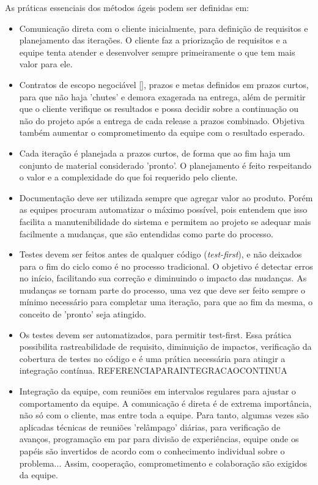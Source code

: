 \documentclass[10pt,a4paper,font=plain]{abnt}
\begin{document}
As práticas essenciais dos métodos ágeis podem ser definidas em:
\begin{itemize}

\item Comunicação direta com o cliente inicialmente, para definição de requisitos e planejamento das iterações. O cliente faz a priorização de requisitos e a equipe tenta atender e desenvolver sempre primeiramente o que tem mais valor para ele. 

\item Contratos de escopo negociável [], prazos e metas definidos em prazos curtos, para que não haja 'chutes' e demora exagerada na entrega, além de permitir que o cliente verifique os resultados e possa decidir sobre a continuação ou não do projeto após a entrega de cada release a prazos combinado. Objetiva também aumentar o comprometimento da equipe com o resultado esperado.

\item Cada iteração é planejada a prazos curtos, de forma que ao fim haja um conjunto de material considerado 'pronto'. O planejamento é feito respeitando o valor e a complexidade do que foi requerido pelo cliente.

\item Documentação deve ser utilizada sempre que agregar valor ao produto. Porém as equipes procuram automatizar o máximo possível, pois entendem que isso facilita a manutenibilidade do sistema e permitem ao projeto se adequar mais facilmente a mudanças, que são entendidas como parte do processo.

\item Testes devem ser feitos antes de qualquer código (\textit{test-first}), e não deixados para o fim do ciclo como é no processo tradicional. O objetivo é detectar erros no início, facilitando sua correção e diminuindo o impacto das mudanças. As mudanças se tornam parte do processo, uma vez que deve ser feito sempre o mínimo necessário para completar uma iteração, para que ao fim da mesma, o conceito de 'pronto' seja atingido.

\item Os testes devem ser automatizados, para permitir test-first. Essa prática possibilita rastreabilidade de requisito, diminuição de impactos, verificação da cobertura de testes no código e é uma prática necessária para atingir a integração contínua. REFERENCIAPARAINTEGRACAOCONTINUA

\item Integração da equipe, com reuniões em intervalos regulares para ajustar o comportamento da equipe. A comunicação é direta é de extrema importância, não só com o cliente, mas entre toda a equipe. Para tanto, algumas vezes são aplicadas técnicas de reuniões 'relâmpago' diárias, para verificação de avanços, programação em par para divisão de experiências, equipe onde os papéis são invertidos de acordo com o conhecimento individual sobre o problema... Assim, cooperação, comprometimento e colaboração são exigidos da equipe. 


\end{itemize}
\end{document}
